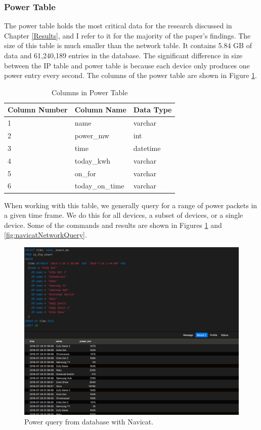 \subsubsection{Power Table}

The power table holds the most critical data for the research discussed in Chapter \ref{Results}, and I refer to it for the majority of the paper's findings. The size of this table is much smaller than the network table. It contains 5.84 GB of data and 61,240,189 entries in the database. The significant difference in size between the IP table and power table is because each device only produces one power entry every second. The columns of the power table are shown in Figure \ref{tab:powcol}.

\begin{table}[H]
    \centering
    \caption{Columns in Power Table}
    \begin{tabular}{@{}lll@{}}
    \toprule
    Column Number & Column Name     & Data Type \\ \midrule
    1             & name            & varchar   \\
    2             & power\_mw       & int       \\
    3             & time            & datetime  \\
    4             & today\_kwh      & varchar   \\
    5             & on\_for         & varchar   \\
    6             & today\_on\_time & varchar
    \end{tabular}
    \label{tab:powcol}
    \end{table}

When working with this table, we generally query for a range of power packets in a given time frame. We do this for all devices, a subset of devices, or a single device. Some of the commands and results are shown in Figures \ref{fig:navicatPowerQuery} and \ref{fig:navicatNetworkQuery}.

\begin{figure}[H]
    \centering
    \includegraphics[width=1\textwidth]{figures/navicatPowerQuery.png}
    \caption{Power query from database with Navicat.}
    \label{fig:navicatPowerQuery}
\end{figure}

